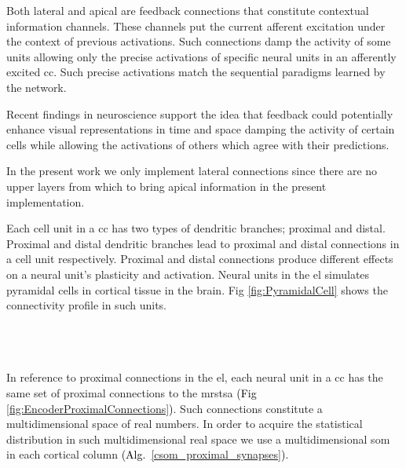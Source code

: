 \documentclass[10pt,letterpaper]{article}
\newcommand{\reviewerfour}[1]{\textcolor{black}{#1}}
\begin{document}
\pagebreak


Both lateral and apical are feedback connections that constitute contextual information channels. 
These channels put the current afferent excitation under the context of previous activations.
Such connections damp the activity of some units allowing only the precise activations
of specific neural units in an afferently excited \gls{cc}.
Such precise activations match the sequential paradigms learned by the network.

Recent findings in neuroscience \cite{Marques2018} support the idea 
that feedback could potentially enhance visual representations in time and space
damping the activity of certain cells while allowing the activations  of others
which agree with their predictions.

In the present work we only implement lateral connections since
there are no upper layers 
from which to bring apical information in the present implementation.

Each cell unit in a \gls{cc} has two types of dendritic branches; proximal and distal.
Proximal and distal dendritic branches lead to proximal and distal connections in a cell unit respectively.
Proximal and distal connections produce different effects on a neural unit's plasticity and activation.
Neural units in the \gls{el} simulates pyramidal cells in cortical tissue in the brain.
Fig \ref{fig:PyramidalCell} shows the connectivity profile in such units. 

~\\
~\\
~\\

In reference to proximal connections in the \gls{el}, each neural unit in a \gls{cc} has the same set of
proximal connections to the \gls{mrstsa} \reviewerfour{(Fig \ref{fig:EncoderProximalConnections})}.
Such connections constitute a multidimensional space of real numbers.
In order to acquire the statistical distribution in such multidimensional real space we use
a multidimensional \gls{som} in each cortical column \reviewerfour{(Alg.~\ref{csom_proximal_synapses})}.
\end{document}
